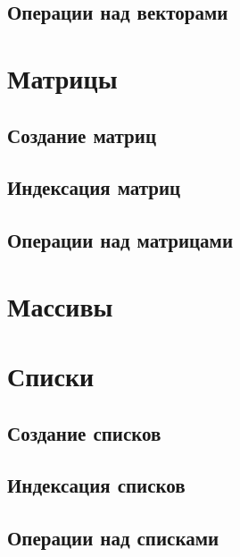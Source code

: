 \documentclass[
  letterpaper,
]{scrbook}
\theoremstyle{definition}
\theoremstyle{remark}
\begin{document}
\subsection{Операции над
векторами}\label{rdstructs-vectors-manipulations}

\section{Матрицы}\label{rdstructs-matrices}

\subsection{Создание матриц}\label{rdstructs-matrices-creation}

\subsection{Индексация матриц}\label{rdstructs-matrices-indexing}

\subsection{Операции над
матрицами}\label{rdstructs-matrices-manipulations}

\section{Массивы}\label{rdstructs-arrays}

\section{Списки}\label{rdstructs-lists}

\subsection{Создание списков}\label{rdstructs-lists-creation}

\subsection{Индексация списков}\label{rdstructs-lists-indexing}

\subsection{Операции над списками}\label{rdstructs-lists-manipulations}
\end{document}
